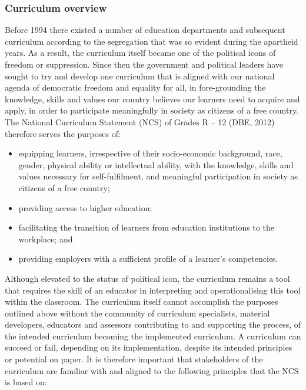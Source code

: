 \subsubsection{Curriculum overview}
Before 1994 there existed a number of education departments and subsequent curriculum according to the segregation that was so evident during the apartheid years. As a result, the curriculum itself became one of the political icons of freedom or suppression. Since then the government and political leaders have sought to try and develop one curriculum that is aligned with our national agenda of democratic freedom and equality for all, in fore-grounding the knowledge, skills and values our country believes our learners need to acquire and apply, in order to participate meaningfully in society as citizens of a free country. The National Curriculum Statement (NCS) of Grades R – 12 (DBE, 2012) therefore serves the purposes of: 
\begin{itemize}
\item equipping learners, irrespective of their socio-economic background, race, gender, physical ability or intellectual ability, with the knowledge, skills and values necessary for self-fulfilment, and meaningful participation in society as citizens of a free country; 
\item providing access to higher education; 
\item facilitating the transition of learners from education institutions to the workplace; and 
\item providing employers with a sufficient profile of a learner’s competencies. 
\end{itemize}
Although elevated to the status of political icon, the curriculum remains a tool that requires the skill of an educator in interpreting and operationalising this tool within the classroom. The curriculum itself cannot accomplish the purposes outlined above without the community of curriculum specialists, material developers, educators and assessors contributing to and supporting the process, of the intended curriculum becoming the implemented curriculum. A curriculum can succeed or fail, depending on its implementation, despite its intended principles or potential on paper. It is therefore important that stakeholders of the curriculum are familiar with and aligned to the following principles that the NCS is based on: 

